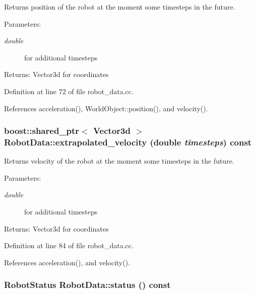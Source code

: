 Returns position of the robot at the moment some timesteps in the future. \begin{Desc}
\item[Parameters:]
\begin{description}
\item[{\em double}]for additional timesteps \end{description}
\end{Desc}
\begin{Desc}
\item[Returns:]Vector3d for coordinates \end{Desc}


Definition at line 72 of file robot\_\-data.cc.

References acceleration(), WorldObject::position(), and velocity().\hypertarget{class_robot_data_37848feb0ad585292fd126465e126f67}{
\subsubsection[extrapolated\_\-velocity]{\setlength{\rightskip}{0pt plus 5cm}boost::shared\_\-ptr$<$ Vector3d $>$ RobotData::extrapolated\_\-velocity (double {\em timesteps}) const}}
\label{class_robot_data_37848feb0ad585292fd126465e126f67}


Returns velocity of the robot at the moment some timesteps in the future. \begin{Desc}
\item[Parameters:]
\begin{description}
\item[{\em double}]for additional timesteps \end{description}
\end{Desc}
\begin{Desc}
\item[Returns:]Vector3d for coordinates \end{Desc}


Definition at line 84 of file robot\_\-data.cc.

References acceleration(), and velocity().\hypertarget{class_robot_data_9c8d2252555f1d5866c0332a80e82685}{
\subsubsection[status]{\setlength{\rightskip}{0pt plus 5cm}RobotStatus RobotData::status () const}}
\label{class_robot_data_9c8d2252555f1d5866c0332a80e82685}


